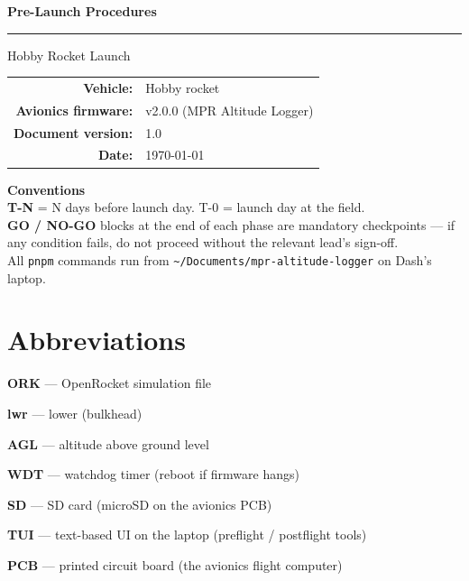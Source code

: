\documentclass[11pt,a4paper,oneside]{report}
\begin{document}
\begin{titlepage}
  \centering
  \vspace*{2cm}
  {\sffamily\bfseries\color{rocketblue}\Huge Pre-Launch Procedures\par}
  \vspace{0.5cm}
  {\color{linegrey}\rule{0.6\textwidth}{1pt}\par}
  \vspace{0.8cm}
  {\sffamily\Large Hobby Rocket Launch\par}
  \vspace{2cm}

  \begin{tabular}{rl}
    \sffamily\bfseries Vehicle: & Hobby rocket \\[4pt]
    \sffamily\bfseries Avionics firmware: & v2.0.0 (MPR Altitude Logger) \\[4pt]
    \sffamily\bfseries Document version: & 1.0 \\[4pt]
    \sffamily\bfseries Date: & \today \\
  \end{tabular}

  \vfill

  \begin{infobox}
    \sffamily\small
    \textbf{Conventions} \\[2pt]
    \textbf{T-N} = N days before launch day. T-0 = launch day at the field. \\
    \textbf{GO / NO-GO} blocks at the end of each phase are mandatory checkpoints --- if any condition fails, do not proceed without the relevant lead's sign-off. \\
    All \texttt{pnpm} commands run from \texttt{\textasciitilde/Documents/mpr-altitude-logger} on Dash's laptop.
  \end{infobox}

  \vspace{1cm}
\end{titlepage}

\thispagestyle{plain}
\section*{Abbreviations}
\begin{plainitem}
  \item \textbf{ORK} --- OpenRocket simulation file
  \item \textbf{lwr} --- lower (bulkhead)
  \item \textbf{AGL} --- altitude above ground level
  \item \textbf{WDT} --- watchdog timer (reboot if firmware hangs)
  \item \textbf{SD} --- SD card (microSD on the avionics PCB)
  \item \textbf{TUI} --- text-based UI on the laptop (preflight / postflight tools)
  \item \textbf{PCB} --- printed circuit board (the avionics flight computer)
\end{plainitem}
\end{document}
